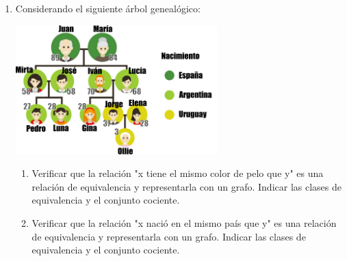 \documentclass[a4paper]{article}
\newcommand{\answer}{\item[**]}
\newcommand{\exercise}{\item}
\begin{document}
\begin{enumerate}
\begin{enumerate} [label=(\alph*)]
		\item Dada la relación $R$ definida en $\mathbb{R}$, se establece la relación como "$x$ es divisor de $y$" donde $x\mathrel{R}y$ se anota $x~|~y$ definida de la forma $R = \left\lbrace (x,y) ~|~ \exists n \in \mathbb{N} ~~( y=n.x ) \right\rbrace$
		\answer Relación de orden amplio (transitiva, antisimétrica, reflexiva)

		\item Dados dos conjuntos $A$ y $B$ se define la relación "$A$ es subconjunto de en $B$" donde $x\mathrel{R}y$ se anota $A\subseteq B$ definida de la forma $R = \left\lbrace (A,B) ~|~ \forall x \in A ~~( x\in A \to x\in B) \right\rbrace$
		\answer Relación de orden amplio (transitiva, antisimétrica, reflexiva)
		
		\item Dada la relación $R$ definida en $\mathbb{R}$, se establece la relación "$x$ es menor que $y$" donde $x\mathrel{R}y$ se anota $x<y$ definida de la forma $R = \left\lbrace (x,y) ~|~ \exists k \in (0,+\infty) ~~(y=x+k)  \right\rbrace$
		\answer Relación de orden estricto (transitiva, asimétrica e irreflexiva)
	\end{enumerate}


	\exercise Considerando el siguiente árbol genealógico: \\ \begin{center} \includegraphics[height=5cm]{familia.png} \end{center}
	\begin{enumerate} [label=(\alph*)]
		\item Verificar que la relación "x tiene el mismo color de pelo que y" es una relación de equivalencia y representarla con un grafo. Indicar las clases de equivalencia y el conjunto cociente.

		\item Verificar que la relación "x nació en el mismo país que y" es una relación de equivalencia y representarla con un grafo. Indicar las clases de equivalencia y el conjunto cociente.
		

\end{enumerate}
\end{enumerate}
\end{document}
